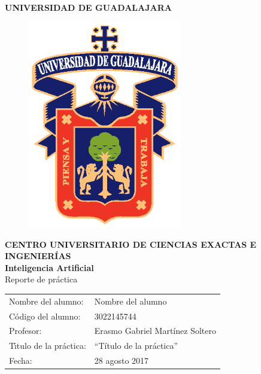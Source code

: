 \documentclass[11pt]{article}
\newcommand{\elalumno}{Nombre del alumno}
\newcommand{\codigoalm}{3022145744}
\newcommand{\director}{Erasmo Gabriel Martínez Soltero}
\newcommand{\fecha}{28 agosto 2017}
\newcommand{\tituloPractica}{Título de la práctica}
\begin{document}
\begin{center}
  {\Large \textbf{UNIVERSIDAD DE GUADALAJARA}}\\
  \begin{figure} [H]
	\begin{center}
  		\includegraphics[width=0.6\textwidth]{udgEPS}
	\end{center}
  \end{figure}
  {\large \textbf{CENTRO UNIVERSITARIO DE CIENCIAS EXACTAS E INGENIERÍAS}}\\
  \vspace{0.25cm}
{\large \textbf{Inteligencia Artificial}}\\
\vspace{0.25cm}
\vspace{0.5cm}
{\large Reporte de práctica} \vspace{1cm} \\

\begin{tabular}{p{4cm}p{8cm}}
Nombre del alumno: & \elalumno \\
Código del alumno: & \codigoalm \\
Profesor: & \director \\
T\'\i tulo de la práctica: &
``{\tituloPractica}'' \\
Fecha: & \fecha
\end{tabular}
\end{center}
\end{document}
